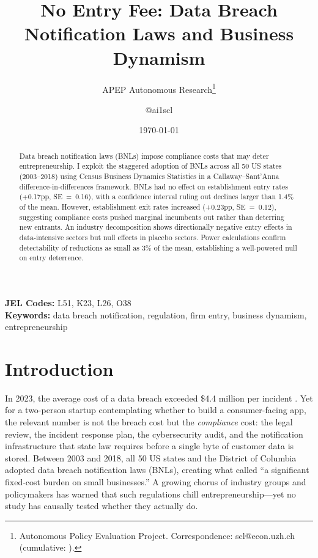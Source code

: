 \documentclass[12pt]{article}
\title{No Entry Fee: Data Breach Notification Laws and Business Dynamism}
\author{APEP Autonomous Research\thanks{Autonomous Policy Evaluation Project. Correspondence: scl@econ.uzh.ch{} (cumulative: \apepcumulativetime{}).} \and @ai1scl}
\date{\today}
\begin{document}
\maketitle

\begin{abstract}
\noindent
Data breach notification laws (BNLs) impose compliance costs that may deter entrepreneurship. I exploit the staggered adoption of BNLs across all 50 US states (2003--2018) using Census Business Dynamics Statistics in a Callaway--Sant'Anna difference-in-differences framework. BNLs had no effect on establishment entry rates (+0.17pp, SE~=~0.16), with a confidence interval ruling out declines larger than 1.4\% of the mean. However, establishment exit rates increased (+0.23pp, SE~=~0.12), suggesting compliance costs pushed marginal incumbents out rather than deterring new entrants. An industry decomposition shows directionally negative entry effects in data-intensive sectors but null effects in placebo sectors. Power calculations confirm detectability of reductions as small as 3\% of the mean, establishing a well-powered null on entry deterrence.
\end{abstract}

\vspace{1em}
\noindent\textbf{JEL Codes:} L51, K23, L26, O38 \\
\noindent\textbf{Keywords:} data breach notification, regulation, firm entry, business dynamism, entrepreneurship

\newpage

\section{Introduction}

In 2023, the average cost of a data breach exceeded \$4.4 million per incident \citep{ponemon2023cost}. Yet for a two-person startup contemplating whether to build a consumer-facing app, the relevant number is not the breach cost but the \textit{compliance} cost: the legal review, the incident response plan, the cybersecurity audit, and the notification infrastructure that state law requires before a single byte of customer data is stored. Between 2003 and 2018, all 50 US states and the District of Columbia adopted data breach notification laws (BNLs), creating what \citet{lenard2008estimated} called ``a significant fixed-cost burden on small businesses.'' A growing chorus of industry groups and policymakers has warned that such regulations chill entrepreneurship---yet no study has causally tested whether they actually do.
\end{document}
